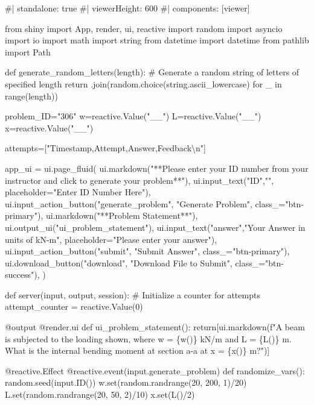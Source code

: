 \documentclass[
  letterpaper,
  DIV=11,
  numbers=noendperiod]{scrreprt}
\newenvironment{Shaded}{\begin{snugshade}}{\end{snugshade}}
\newcommand{\NormalTok}[1]{\textcolor[rgb]{0.00,0.23,0.31}{#1}}
\begin{document}
\begin{Shaded}
\begin{Highlighting}[]
\NormalTok{\#| standalone: true}
\NormalTok{\#| viewerHeight: 600}
\NormalTok{\#| components: [viewer]}

\NormalTok{from shiny import App, render, ui, reactive}
\NormalTok{import random}
\NormalTok{import asyncio}
\NormalTok{import io}
\NormalTok{import math}
\NormalTok{import string}
\NormalTok{from datetime import datetime}
\NormalTok{from pathlib import Path}

\NormalTok{def generate\_random\_letters(length):}
\NormalTok{    \# Generate a random string of letters of specified length}
\NormalTok{    return \textquotesingle{}\textquotesingle{}.join(random.choice(string.ascii\_lowercase) for \_ in range(length)) }

\NormalTok{problem\_ID="306"}
\NormalTok{w=reactive.Value("\_\_")}
\NormalTok{L=reactive.Value("\_\_")}
\NormalTok{x=reactive.Value("\_\_")}


\NormalTok{attempts=["Timestamp,Attempt,Answer,Feedback\textbackslash{}n"]}

\NormalTok{app\_ui = ui.page\_fluid(}
\NormalTok{    ui.markdown("**Please enter your ID number from your instructor and click to generate your problem**"),}
\NormalTok{    ui.input\_text("ID","", placeholder="Enter ID Number Here"),}
\NormalTok{    ui.input\_action\_button("generate\_problem", "Generate Problem", class\_="btn{-}primary"),}
\NormalTok{    ui.markdown("**Problem Statement**"),}
\NormalTok{    ui.output\_ui("ui\_problem\_statement"),}
\NormalTok{    ui.input\_text("answer","Your Answer in units of kN{-}m", placeholder="Please enter your answer"),}
\NormalTok{    ui.input\_action\_button("submit", "Submit Answer", class\_="btn{-}primary"),}
\NormalTok{    ui.download\_button("download", "Download File to Submit", class\_="btn{-}success"),}
\NormalTok{)}


\NormalTok{def server(input, output, session):}
\NormalTok{    \# Initialize a counter for attempts}
\NormalTok{    attempt\_counter = reactive.Value(0)}

\NormalTok{    @output}
\NormalTok{    @render.ui}
\NormalTok{    def ui\_problem\_statement():}
\NormalTok{        return[ui.markdown(f"A beam is subjected to the loading shown, where w = \{w()\} kN/m and L = \{L()\} m. What is the internal bending moment at section a{-}a at x = \{x()\} m?")]}
    
\NormalTok{    @reactive.Effect}
\NormalTok{    @reactive.event(input.generate\_problem)}
\NormalTok{    def randomize\_vars():}
\NormalTok{        random.seed(input.ID())}
\NormalTok{        w.set(random.randrange(20, 200, 1)/20)}
\NormalTok{        L.set(random.randrange(20, 50, 2)/10)}
\NormalTok{        x.set(L()/2)}
        

\end{Highlighting}
\end{Shaded}
\end{document}
